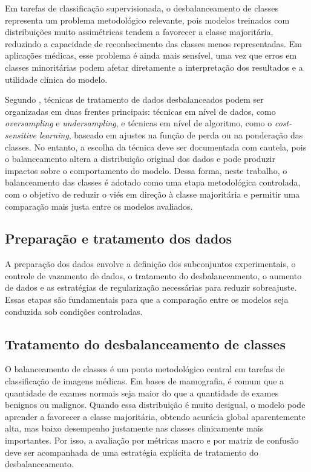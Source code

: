 \documentclass[
    12pt,
    openright,
    oneside,
    a4paper,
    english,
    brazil
]{abntex2}
\begin{document}
Em tarefas de classificação supervisionada, o desbalanceamento de classes representa um problema metodológico relevante, pois modelos treinados com distribuições muito assimétricas tendem a favorecer a classe majoritária, reduzindo a capacidade de reconhecimento das classes menos representadas. Em aplicações médicas, esse problema é ainda mais sensível, uma vez que erros em classes minoritárias podem afetar diretamente a interpretação dos resultados e a utilidade clínica do modelo.

Segundo \cite{silva2025balanceamento}, técnicas de tratamento de dados desbalanceados podem ser organizadas em duas frentes principais: técnicas em nível de dados, como \textit{oversampling} e \textit{undersampling}, e técnicas em nível de algoritmo, como o \textit{cost-sensitive learning}, baseado em ajustes na função de perda ou na ponderação das classes. No entanto, a escolha da técnica deve ser documentada com cautela, pois o balanceamento altera a distribuição original dos dados e pode produzir impactos sobre o comportamento do modelo. Dessa forma, neste trabalho, o balanceamento das classes é adotado como uma etapa metodológica controlada, com o objetivo de reduzir o viés em direção à classe majoritária e permitir uma comparação mais justa entre os modelos avaliados.

\subsection{Preparação e tratamento dos dados}

A preparação dos dados envolve a definição dos subconjuntos experimentais, o controle de vazamento de dados, o tratamento do desbalanceamento, o aumento de dados e as estratégias de regularização necessárias para reduzir sobreajuste. Essas etapas são fundamentais para que a comparação entre os modelos seja conduzida sob condições controladas.

\subsection{Tratamento do desbalanceamento de classes}
\label{subsec:tratamento_desbalanceamento_classes}

O balanceamento de classes é um ponto metodológico central em tarefas de classificação de imagens médicas. Em bases de mamografia, é comum que a quantidade de exames normais seja maior do que a quantidade de exames benignos ou malignos. Quando essa distribuição é muito desigual, o modelo pode aprender a favorecer a classe majoritária, obtendo acurácia global aparentemente alta, mas baixo desempenho justamente nas classes clinicamente mais importantes. Por isso, a avaliação por métricas macro e por matriz de confusão deve ser acompanhada de uma estratégia explícita de tratamento do desbalanceamento.
\end{document}
